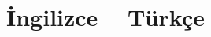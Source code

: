 \bigskip

\section*{İngilizce -- Türkçe}

\ifdefined\HCode
\def\ltdevam{}
\else
\def\ltdevam{%
\toprule
\textbf{İngilizce Terim (cont.)} & \textbf{Türkçe Karşılık} \\
\midrule
\endhead
\midrule
\multicolumn{2}{r}{\small\textit{(continued on next page)}} \\
\endfoot
\bottomrule
\endlastfoot}
\fi


